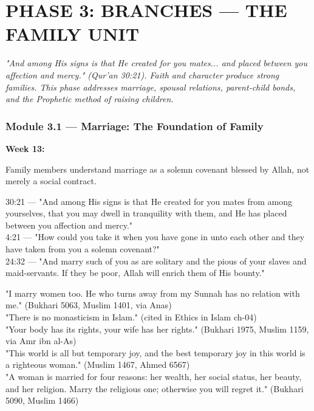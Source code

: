 \documentclass[11pt,a4paper]{article}
\begin{document}
\vspace{6pt}\noindent{\color{border}\rule{\textwidth}{0.5pt}}\vspace{6pt}

\newpage
\section{PHASE 3: BRANCHES --- THE FAMILY UNIT}

\begin{quotebox}\itshape "And among His signs is that He created for you mates... and placed between you affection and mercy." (Qur'an 30:21). Faith and character produce strong families. This phase addresses marriage, spousal relations, parent-child bonds, and the Prophetic method of raising children.\end{quotebox}

\subsubsection*{Module 3.1 --- Marriage: The Foundation of Family}
\textbf{Week 13:} 

\begin{outcomebox} Family members understand marriage as a solemn covenant blessed by Allah, not merely a social contract. \end{outcomebox}

\begin{quranbox} 30:21 --- "And among His signs is that He created for you mates from among yourselves, that you may dwell in tranquility with them, and He has placed between you affection and mercy." \\ 4:21 --- "How could you take it when you have gone in unto each other and they have taken from you a solemn covenant?" \\ 24:32 --- "And marry such of you as are solitary and the pious of your slaves and maid-servants. If they be poor, Allah will enrich them of His bounty." \end{quranbox}

\begin{hadithbox} "I marry women too. He who turns away from my Sunnah has no relation with me." (Bukhari 5063, Muslim 1401, via Anas) \\ "There is no monasticism in Islam." (cited in Ethics in Islam ch-04) \\ "Your body has its rights, your wife has her rights." (Bukhari 1975, Muslim 1159, via Amr ibn al-As) \\ "This world is all but temporary joy, and the best temporary joy in this world is a righteous woman." (Muslim 1467, Ahmed 6567) \\ "A woman is married for four reasons: her wealth, her social status, her beauty, and her religion. Marry the religious one; otherwise you will regret it." (Bukhari 5090, Muslim 1466) \end{hadithbox}
\end{document}
